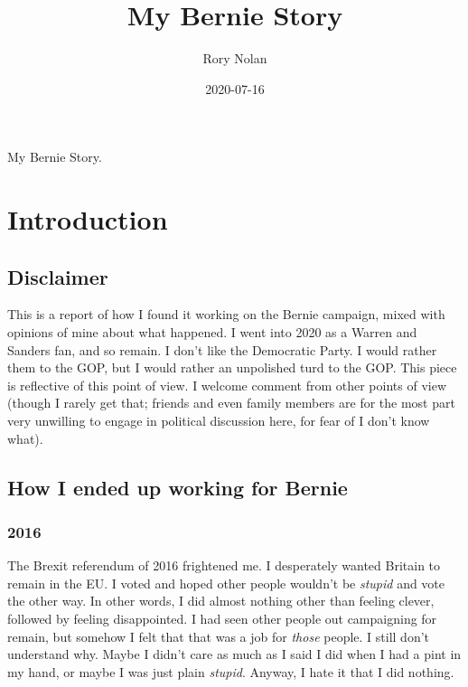 \documentclass[]{book}
\title{My Bernie Story}
\author{Rory Nolan}
\date{2020-07-16}
\begin{document}
\maketitle

{
\setcounter{tocdepth}{1}
\tableofcontents
}
My Bernie Story.

\hypertarget{intro}{%
\chapter{Introduction}\label{intro}}

\hypertarget{disclaimer}{%
\section{Disclaimer}\label{disclaimer}}

This is a report of how I found it working on the Bernie campaign, mixed with opinions of mine about what happened. I went into 2020 as a Warren and Sanders fan, and so remain. I don't like the Democratic Party. I would rather them to the GOP, but I would rather an unpolished turd to the GOP. This piece is reflective of this point of view. I welcome comment from other points of view (though I rarely get that; friends and even family members are for the most part very unwilling to engage in political discussion here, for fear of I don't know what).

\hypertarget{how-i-ended-up-working-for-bernie}{%
\section{How I ended up working for Bernie}\label{how-i-ended-up-working-for-bernie}}

\hypertarget{section}{%
\subsection{2016}\label{section}}

The Brexit referendum of 2016 frightened me. I desperately wanted Britain to remain in the EU. I voted and hoped other people wouldn't be \emph{stupid} and vote the other way. In other words, I did almost nothing other than feeling clever, followed by feeling disappointed. I had seen other people out campaigning for remain, but somehow I felt that that was a job for \emph{those} people. I still don't understand why. Maybe I didn't care as much as I said I did when I had a pint in my hand, or maybe I was just plain \emph{stupid}. Anyway, I hate it that I did nothing.
\end{document}
